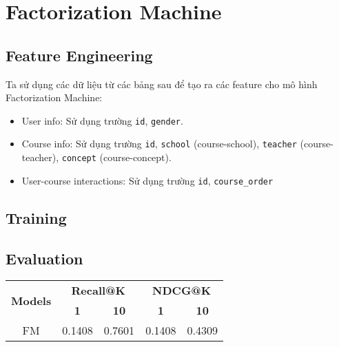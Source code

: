 \section{Factorization Machine}
\subsection{Feature Engineering}
Ta sử dụng các dữ liệu từ các bảng sau để tạo ra các feature cho mô hình Factorization Machine:
\begin{itemize}
    \item User info: Sử dụng trường \texttt{id}, \texttt{gender}.
    \item Course info: Sử dụng trường \texttt{id}, \texttt{school} (course-school), \texttt{teacher} (course-teacher), \texttt{concept} (course-concept).
    \item User-course interactions: Sử dụng trường \texttt{id}, \texttt{course\_order}
\end{itemize}
\subsection{Training}

\subsection{Evaluation}
\begin{table}[h]
    \begin{center}
    \begin{tabular}{| c | c | c | c | c |}
    \hline
    \multirow{2}{*}{
        \centering
        \textbf{Models}
        } & \multicolumn{2}{c|}{\textbf{Recall@K}} & \multicolumn{2}{c|}{\textbf{NDCG@K}} \\ 
    \cline{2-5}
    & \textbf{1} & \textbf{10} & \textbf{1} & \textbf{10} \\
    \hline
    
    FM & 0.1408 & 0.7601 & 0.1408 & 0.4309 \\ \hline
    
    \end{tabular}
    \end{center}
    \end{table}